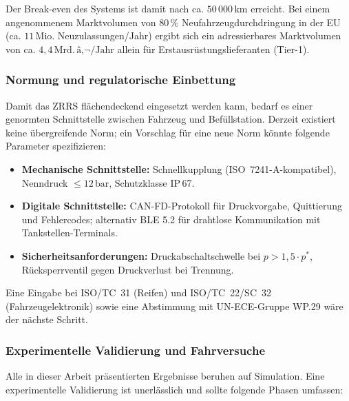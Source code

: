﻿\documentclass[a4paper,12pt]{article}
\theoremstyle{definition}
\begin{document}
Der Break-even des Systems ist damit nach ca. $50\,000\,\text{km}$ erreicht.
Bei einem angenommenem Marktvolumen von $80\,\%$ Neufahrzeugdurchdringung in
der EU (ca. $11\,\text{Mio.}$ Neuzulassungen/Jahr) ergibt sich ein
adressierbares Marktvolumen von ca. $4{,}4\,\text{Mrd.}\,\text{â‚¬/Jahr}$
allein für Erstausrüstungslieferanten (Tier-1).

\subsubsection{Normung und regulatorische Einbettung}

Damit das ZRRS flächendeckend eingesetzt werden kann, bedarf es einer
genormten Schnittstelle zwischen Fahrzeug und Befüllstation. Derzeit existiert
keine übergreifende Norm; ein Vorschlag für eine neue Norm könnte folgende
Parameter spezifizieren:

\begin{itemize}
    \item \textbf{Mechanische Schnittstelle:} Schnellkupplung (ISO~7241-A-kompatibel),
    Nenndruck $\leq 12\,\text{bar}$, Schutzklasse IP\,67.
    \item \textbf{Digitale Schnittstelle:} CAN-FD-Protokoll für Druckvorgabe,
    Quittierung und Fehlercodes; alternativ BLE 5.2 für drahtlose Kommunikation
    mit Tankstellen-Terminals.
    \item \textbf{Sicherheitsanforderungen:} Druckabschaltschwelle bei
    $p > 1{,}5 \cdot p^*$, Rücksperrventil gegen Druckverlust bei Trennung.
\end{itemize}

Eine Eingabe bei ISO/TC~31 (Reifen) und ISO/TC~22/SC~32 (Fahrzeugelektronik)
sowie eine Abstimmung mit UN-ECE-Gruppe WP.29 wäre der nächste Schritt.

\subsubsection{Experimentelle Validierung und Fahrversuche}

Alle in dieser Arbeit präsentierten Ergebnisse beruhen auf Simulation.
Eine experimentelle Validierung ist unerlässlich und sollte folgende
Phasen umfassen:
\end{document}
